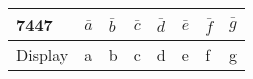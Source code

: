 \begin{tabular}{|p{3cm}|p{1cm}|p{1cm}|p{1cm}|p{1cm}|p{1cm}|p{1cm}|p{1cm}|}                            
\hline                                         
7447& $\bar{a}$ & $\bar{b}$ & $\bar{c}$ & $\bar{d}$ & $\bar{e}$ & $\bar{f}$ & $\bar{g}$\\          
\hline                                          
Display& a& b& c& d& e& f& g\\         
\hline                                        
\end{tabular}
